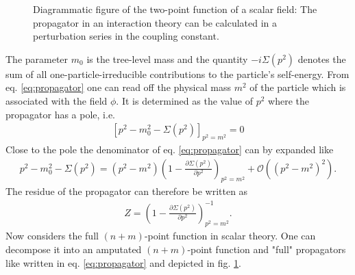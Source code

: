 \begin{figure}[!htbp]
\begin{center}
\caption{Diagrammatic figure of the two-point function of a scalar field: The propagator in an interaction theory can be calculated in a perturbation series in the coupling constant.}\label{fig:fullpropagator}
\end{center}
\end{figure}
The parameter $m_0$ is the tree-level mass and the quantity $-i \Sigma(p^2)$ denotes the sum of all one-particle-irreducible contributions to the particle's self-energy. From eq. \ref{eq:propagator} one can read off the physical mass $m^2$ of the particle which is associated with the field $\phi$. It is determined as the value of $p^2$ where the propagator has a pole, i.e. 
\begin{align}
\left[ p^2 - m_0^2 - \Sigma(p^2)\right]_{p^2 = m^2} = 0
\end{align}
Close to the pole the denominator of eq. \ref{eq:propagator} can by expanded like
\begin{align}
p^2 - m_0^2 - \Sigma(p^2) = (p^2 - m^2)\left( 1 - \frac{\partial \Sigma(p^2)}{\partial p^2} \right)_{p^2 = m^2} + \mathcal{O}((p^2 - m^2)^2).
\end{align}
The residue of the propagator can therefore be written as 
\begin{align}
Z = \left( 1 - \frac{\partial \Sigma(p^2)}{\partial p^2} \right)_{p^2 = m^2}^{-1}.
\end{align}
Now considers the full $(n+m)$-point function in scalar theory. One can decompose it into an amputated $(n+m)$-point function and "full" propagators like written in eq. \ref{eq:propagator} and depicted in fig. \ref{fig:fullpropagator}.
